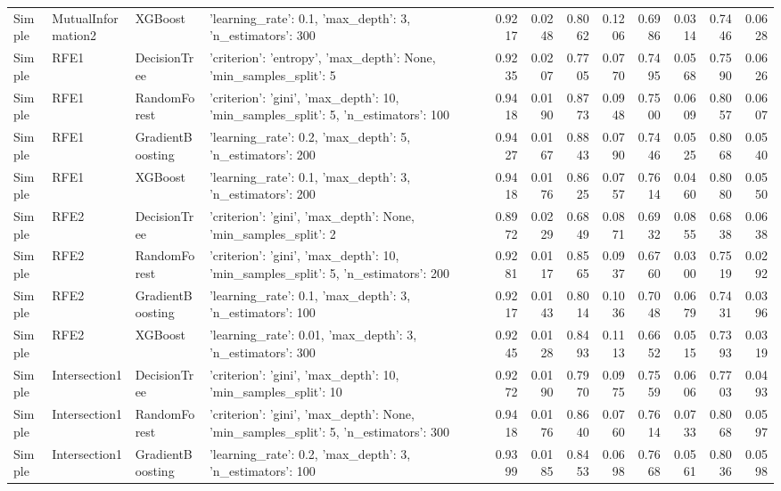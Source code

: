 \begin{tabular}{llllrrrrrrrr}
Simple & MutualInformation2 & XGBoost & {'learning_rate': 0.1, 'max_depth': 3, 'n_estimators': 300} & 0.9217 & 0.0248 & 0.8062 & 0.1206 & 0.6986 & 0.0314 & 0.7446 & 0.0628 \\
Simple & RFE1 & DecisionTree & {'criterion': 'entropy', 'max_depth': None, 'min_samples_split': 5} & 0.9235 & 0.0207 & 0.7705 & 0.0770 & 0.7495 & 0.0568 & 0.7590 & 0.0626 \\
Simple & RFE1 & RandomForest & {'criterion': 'gini', 'max_depth': 10, 'min_samples_split': 5, 'n_estimators': 100} & 0.9418 & 0.0190 & 0.8773 & 0.0948 & 0.7500 & 0.0609 & 0.8057 & 0.0607 \\
Simple & RFE1 & GradientBoosting & {'learning_rate': 0.2, 'max_depth': 5, 'n_estimators': 200} & 0.9427 & 0.0167 & 0.8843 & 0.0790 & 0.7446 & 0.0525 & 0.8068 & 0.0540 \\
Simple & RFE1 & XGBoost & {'learning_rate': 0.1, 'max_depth': 3, 'n_estimators': 200} & 0.9418 & 0.0176 & 0.8625 & 0.0757 & 0.7614 & 0.0460 & 0.8080 & 0.0550 \\
Simple & RFE2 & DecisionTree & {'criterion': 'gini', 'max_depth': None, 'min_samples_split': 2} & 0.8972 & 0.0229 & 0.6849 & 0.0871 & 0.6932 & 0.0855 & 0.6838 & 0.0638 \\
Simple & RFE2 & RandomForest & {'criterion': 'gini', 'max_depth': 10, 'min_samples_split': 5, 'n_estimators': 200} & 0.9281 & 0.0117 & 0.8565 & 0.0937 & 0.6760 & 0.0300 & 0.7519 & 0.0292 \\
Simple & RFE2 & GradientBoosting & {'learning_rate': 0.1, 'max_depth': 3, 'n_estimators': 100} & 0.9217 & 0.0143 & 0.8014 & 0.1036 & 0.7048 & 0.0679 & 0.7431 & 0.0396 \\
Simple & RFE2 & XGBoost & {'learning_rate': 0.01, 'max_depth': 3, 'n_estimators': 300} & 0.9245 & 0.0128 & 0.8493 & 0.1113 & 0.6652 & 0.0515 & 0.7393 & 0.0319 \\
Simple & Intersection1 & DecisionTree & {'criterion': 'gini', 'max_depth': 10, 'min_samples_split': 10} & 0.9272 & 0.0190 & 0.7970 & 0.0975 & 0.7559 & 0.0606 & 0.7703 & 0.0493 \\
Simple & Intersection1 & RandomForest & {'criterion': 'gini', 'max_depth': None, 'min_samples_split': 5, 'n_estimators': 300} & 0.9418 & 0.0176 & 0.8640 & 0.0760 & 0.7614 & 0.0733 & 0.8068 & 0.0597 \\
Simple & Intersection1 & GradientBoosting & {'learning_rate': 0.2, 'max_depth': 3, 'n_estimators': 100} & 0.9399 & 0.0185 & 0.8453 & 0.0698 & 0.7668 & 0.0561 & 0.8036 & 0.0598 \\

\end{tabular}
